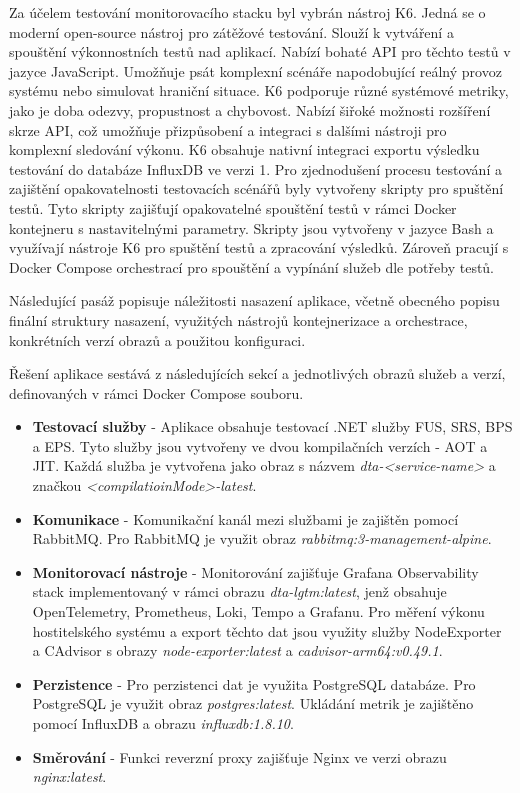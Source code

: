 
Za účelem testování monitorovacího stacku byl vybrán nástroj K6. Jedná se o moderní open-source nástroj pro zátěžové testování. Slouží k vytváření a spouštění výkonnostních testů nad aplikací. Nabízí bohaté API pro těchto testů v jazyce JavaScript. Umožňuje psát komplexní scénáře napodobující reálný provoz systému nebo simulovat hraniční situace. K6 podporuje různé systémové metriky, jako je doba odezvy, propustnost a chybovost. Nabízí šiřoké možnosti rozšíření skrze API, což umožňuje přizpůsobení a integraci s dalšími nástroji pro komplexní sledování výkonu. K6 obsahuje nativní integraci exportu výsledku testování do databáze InfluxDB ve verzi 1. Pro zjednodušení procesu testování a zajištění opakovatelnosti testovacích scénářů byly vytvořeny skripty pro spuštění testů. Tyto skripty zajišťují opakovatelné spouštění testů v rámci Docker kontejneru s nastavitelnými parametry. Skripty jsou vytvořeny v jazyce Bash a využívají nástroje K6 pro spuštění testů a zpracování výsledků. Zároveň pracují s Docker Compose orchestrací pro spouštění a vypínání služeb dle potřeby testů.


Následující pasáž popisuje náležitosti nasazení aplikace, včetně obecného popisu finální struktury nasazení, využitých nástrojů kontejnerizace a orchestrace, konkrétních verzí obrazů a použitou konfiguraci.


Řešení aplikace sestává z následujících sekcí a jednotlivých obrazů služeb a verzí, definovaných v rámci Docker Compose souboru.

\begin{itemize}
    \item \textbf{Testovací služby} - Aplikace obsahuje testovací .NET služby FUS, SRS, BPS a EPS. Tyto služby jsou vytvořeny ve dvou kompilačních verzích - AOT a JIT. Každá služba je vytvořena jako obraz s názvem \emph{dta-<service-name>} a značkou \emph{<compilatioinMode>-latest}.
    \item \textbf{Komunikace} - Komunikační kanál mezi službami je zajištěn pomocí RabbitMQ. Pro RabbitMQ je využit obraz \emph{rabbitmq:3-management-alpine}.
    \item \textbf{Monitorovací nástroje} - Monitorování zajišťuje Grafana Observability stack implementovaný v rámci obrazu \emph{dta-lgtm:latest}, jenž obsahuje OpenTelemetry, Prometheus, Loki, Tempo a Grafanu. Pro měření výkonu hostitelského systému a export těchto dat jsou využity služby NodeExporter a CAdvisor s obrazy \emph{node-exporter:latest} a \emph{cadvisor-arm64:v0.49.1}.
    \item \textbf{Perzistence} - Pro perzistenci dat je využita PostgreSQL databáze. Pro PostgreSQL je využit obraz \emph{postgres:latest}. Ukládání metrik je zajištěno pomocí InfluxDB a obrazu \emph{influxdb:1.8.10}.
    \item \textbf{Směrování} - Funkci reverzní proxy zajišťuje Nginx ve verzi obrazu \emph{nginx:latest}.
\end{itemize}

